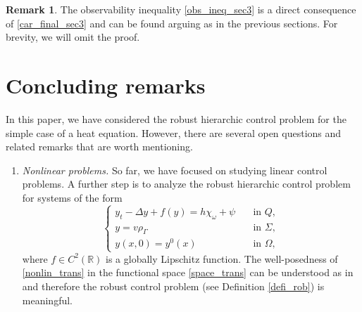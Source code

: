 \documentclass{aims}
\theoremstyle{definition}
\newtheorem{remark}{Remark}
\def\csbd{\rho_{\Gamma}}
\begin{document}
\begin{remark} The observability inequality \eqref{obs_ineq_sec3} is a direct consequence of \eqref{car_final_sec3} and can be found arguing as in the previous sections. For brevity, we will omit the proof. 
\end{remark}

\section{Concluding remarks}\label{sec_conclusion}

In this paper, we have considered the robust hierarchic control problem for the simple case of a heat equation. However, there are several open questions and related remarks that are worth mentioning.

\begin{enumerate}
\item \textit{Nonlinear problems.} So far, we have focused on studying linear control problems. A further step is to analyze the robust hierarchic control problem for systems of the form
%
\begin{equation}\label{nonlin_trans}
\begin{cases}
y_t-\Delta y+f(y)=h\chi_{\omega}+\psi &\quad \text{in } Q,\\
y=v\csbd &\quad\text{in }\Sigma, \\
y(x,0)=y^0(x) &\quad\text{in } \Omega,
\end{cases}
\end{equation}
%
where $f\in C^2(\mathbb{R})$ is a globally Lipschitz function. The well-posedness of \eqref{nonlin_trans} in the  functional space \eqref{space_trans} can be understood as in \cite[Section 8.2]{pighin} and therefore the robust control problem (see Definition \ref{defi_rob}) is meaningful. 


\end{enumerate}
\end{document}
